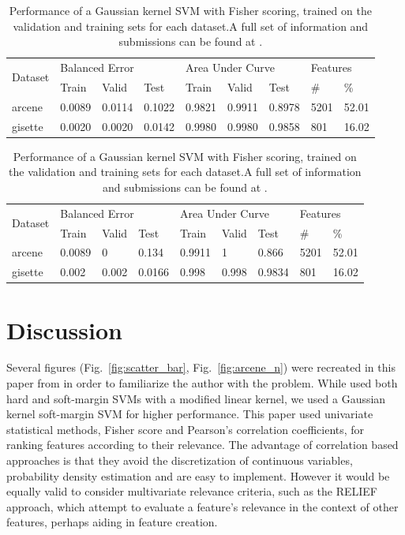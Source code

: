 \documentclass[12pt,a4paper,twocolumn]{article}
\begin{document}
\begin{table}
	\center
	\caption{{\footnotesize Performance of a Gaussian kernel SVM with Fisher scoring, trained on the validation and training sets for each dataset.A full set of information and submissions can be found at \protect\citep{website:competition_results}. }}

	\label{tab:arcene_results_all_data}

\begin{tabular}{|l|l|l|l|l|l|l|l|l|}
	\hline
	\multirow{2}{*}{Dataset}&\multicolumn{3}{|l|}{Balanced 	Error}&\multicolumn{3}{|l|}{Area Under Curve}&\multicolumn{2}{|l|}{Features}\\
	\cline{2-9}
	&Train&Valid&Test&Train&Valid&Test&\#&\%\\
	\hline
	arcene&0.0089&0.0114&0.1022&0.9821&0.9911&0.8978&5201&52.01\\
	\hline
	gisette &	0.0020 & 0.0020 &	0.0142	&0.9980	&0.9980	&0.9858&	801&	16.02 \\
	\hline
\end{tabular}

\begin{tabular}{|l|l|l|l|l|l|l|l|l|}
\hline
	\multirow{2}{*}{Dataset}&\multicolumn{3}{|l|}{Balanced 	Error}&\multicolumn{3}{|l|}{Area Under Curve}&\multicolumn{2}{|l|}{Features}\\
	\cline{2-9}
	&Train&Valid&Test&Train&Valid&Test&\#&\%\\
	\hline
arcene  & 0.0089     & 0         & 0.134     & 0.9911      & 1         & 0.866      & 5201         & 52.01         \\
\hline
gisette & 0.002      & 0.002     & 0.0166    & 0.998       & 0.998     & 0.9834     & 801          & 16.02        \\
\hline 
\end{tabular}
\end{table}

\section{Discussion}

Several figures (Fig.~\ref{fig:scatter_bar}, Fig.~\ref{fig:arcene_n}) were recreated in this paper from \citep{filter_svms} in order to familiarize the author with the problem. While \citep{filter_svms} used both hard and soft-margin SVMs with a modified linear kernel, we used a Gaussian kernel soft-margin SVM for higher performance. This paper used univariate statistical methods, Fisher score and Pearson's correlation coefficients, for ranking features according to their relevance. The advantage of correlation based approaches is that they avoid the discretization of continuous variables, probability density estimation and are easy to implement\citep{filter_methods}. However it would be equally valid to consider multivariate relevance criteria, such as the RELIEF approach, which attempt to evaluate a feature's relevance in the context of other features\citep{feature_selection_intro}, perhaps aiding in feature creation.
\end{document}

